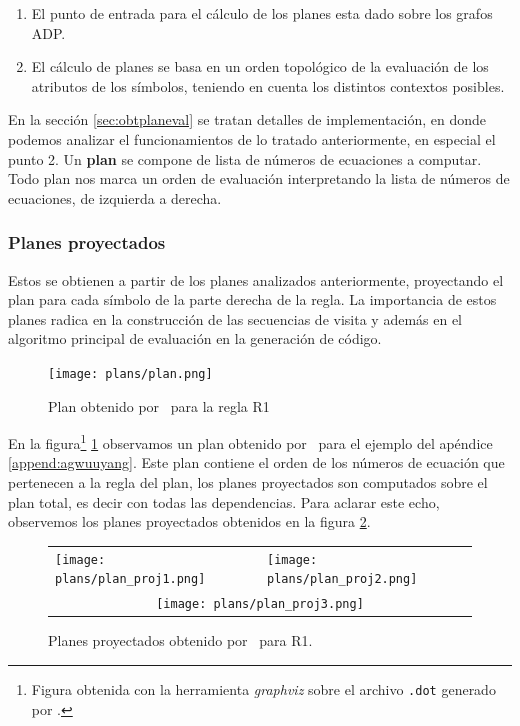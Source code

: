 \begin{enumerate}
\item El punto de entrada para el cálculo de los planes esta dado sobre los grafos ADP. 
\item El cálculo de planes se basa en un orden topológico de la evaluación de los atributos de los símbolos, teniendo en cuenta los distintos contextos posibles.
\end{enumerate}

En la sección \ref{sec:obtplaneval} se tratan detalles de implementación, en donde podemos analizar el funcionamientos de lo tratado anteriormente, en especial el punto 2.
Un \textbf{plan} se compone de lista de números de ecuaciones a computar. Todo plan nos marca un orden de evaluación interpretando la lista de números de ecuaciones, de izquierda a derecha.

\subsubsection*{Planes proyectados}

Estos se obtienen a partir de los planes analizados anteriormente, proyectando el plan para cada símbolo de la parte derecha de la regla. La importancia de estos planes radica en la construcción de las secuencias de visita y además en el algoritmo principal de evaluación en la generación de código.

\begin{figure}[!ht]\centering
 \texttt{[image: plans/plan.png]}
\caption{\label{fig:plan}Plan obtenido por \maggen\ para la regla R1}
\end{figure}

En la figura\footnote{Figura obtenida con la herramienta \textit{graphviz} sobre el archivo \texttt{.dot} generado por \maggen.} \ref{fig:plan} observamos un plan obtenido por \maggen\ para el ejemplo del apéndice \ref{append:agwuuyang}. Este plan contiene el orden de los números de ecuación que pertenecen a la regla del plan, los planes proyectados son computados sobre el plan total, es decir con todas las dependencias. Para aclarar este echo, observemos los planes proyectados obtenidos en la figura \ref{fig:plan_project}.

\begin{figure}[!ht]\centering
\begin{tabular}{l l}
\texttt{[image: plans/plan\_proj1.png]} &
\texttt{[image: plans/plan\_proj2.png]}\\ 
\multicolumn{2}{c}{\texttt{[image: plans/plan\_proj3.png]}}\\
\end{tabular}
\caption{\label{fig:plan_project}Planes proyectados obtenido por \maggen\ para R1.}
\end{figure}

